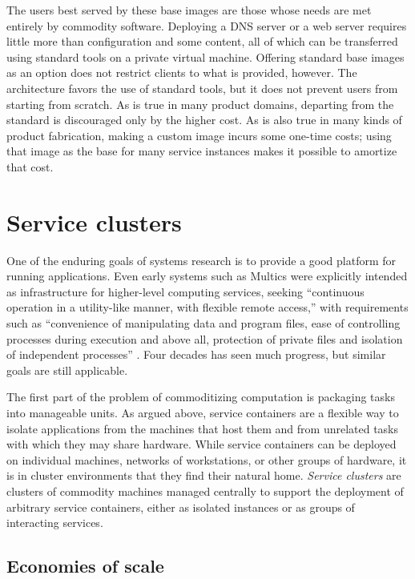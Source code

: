 The users best served by these base images are those whose needs are met entirely by commodity software. Deploying a DNS server or a web server requires little more than configuration and some content, all of which can be transferred using standard tools on a private virtual machine. Offering standard base images as an option does not restrict clients to what is provided, however. The architecture favors the use of standard tools, but it does not prevent users from starting from scratch. As is true in many product domains, departing from the standard is discouraged only by the higher cost. As is also true in many kinds of product fabrication, making a custom image incurs some one-time costs; using that image as the base for many service instances makes it possible to amortize that cost.

\section{Service clusters}

One of the enduring goals of systems research is to provide a good platform for running applications. Even early systems such as Multics were explicitly intended as infrastructure for higher-level computing services, seeking ``continuous operation in a utility-like manner, with flexible remote access,'' with requirements such as ``convenience of manipulating data and program files, ease of controlling processes during execution and above all, protection of private files and isolation of independent processes'' \cite{corbato}. Four decades has seen much progress, but similar goals are still applicable.

The first part of the problem of commoditizing computation is packaging tasks into manageable units. As argued above, service containers are a flexible way to isolate applications from the machines that host them and from unrelated tasks with which they may share hardware. While service containers can be deployed on individual machines, networks of workstations, or other groups of hardware, it is in cluster environments that they find their natural home. \emph{Service clusters} are clusters of commodity machines managed centrally to support the deployment of arbitrary service containers, either as isolated instances or as groups of interacting services.

\subsection{Economies of scale}

